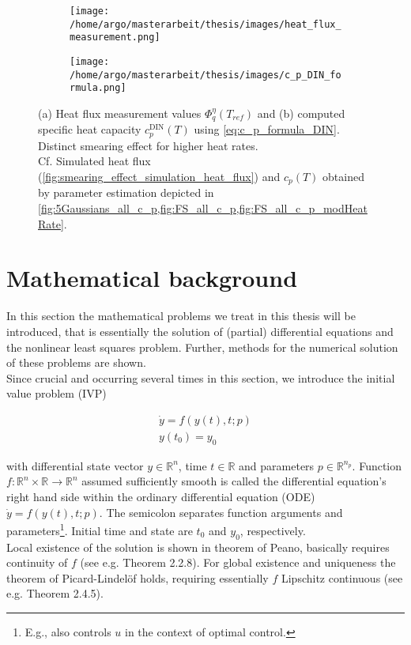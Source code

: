 \documentclass{scrartcl}[12pt, halfparskip]
\numberwithin{equation}{section}
\numberwithin{figure}{section}
\numberwithin{table}{section}
\begin{document}
\begin{figure}[H]
	\centering
	\begin{subfigure}{0.7\textwidth}
		\texttt{[image: /home/argo/masterarbeit/thesis/images/heat\_flux\_measurement.png]}
		\caption{}
		\label{fig:heat_flux_measurements}
	\end{subfigure}
	\begin{subfigure}{0.7\textwidth}
		\texttt{[image: /home/argo/masterarbeit/thesis/images/c\_p\_DIN\_formula.png]}
		\caption{}
		\label{fig:c_p_DIN_formula}
	\end{subfigure}
	\caption{(a) Heat flux measurement values $\varPhi_q^{\eta}(T_{ref})$ and (b) computed specific heat capacity $c_p^{\text{DIN}}(T)$ using \cref{eq:c_p_formula_DIN}. Distinct smearing effect for higher heat rates. \\
	Cf. Simulated heat flux (\cref{fig:smearing_effect_simulation_heat_flux}) and $c_p(T)$ obtained by parameter estimation depicted in \cref{fig:5Gaussians_all_c_p,fig:FS_all_c_p,fig:FS_all_c_p_modHeatRate}.}
\end{figure}


\newpage
\section{Mathematical background}
\label{sec:mathematical_background}

In this section the mathematical problems we treat in this thesis will be introduced, that is essentially the solution of (partial) differential equations and the nonlinear least squares problem. Further, methods for the numerical solution of these problems are shown. \\

Since crucial and occurring several times in this section, we introduce the initial value problem (IVP)

\begin{align}
	\dot{y} = f(y(t), t; p) \label{eq:initial_value_problem_definition} \\
	y(t_0) = y_0 \nonumber
\end{align}

with differential state vector $y \in \mathbb{R}^n$, time $t \in \mathbb{R}$ and parameters $p \in \mathbb{R}^{n_p}$. Function $f: \mathbb{R}^n \times \mathbb{R} \rightarrow \mathbb{R}^n$ assumed sufficiently smooth is called the differential equation's right hand side within the ordinary differential equation (ODE) $\dot{y} = f(y(t), t; p)$. The semicolon separates function arguments and  parameters\footnote{E.g., also controls $u$ in the context of optimal control.}. Initial time and state are $t_0$ and $y_0$, respectively. \\
Local existence of the solution is shown in theorem of Peano, basically requires continuity of $f$ (see e.g. \cite{ODE_analytic} Theorem 2.2.8).
For global existence and uniqueness the theorem of Picard-Lindelöf holds, requiring essentially $f$ Lipschitz continuous (see e.g. \cite{ODE_analytic} Theorem 2.4.5). \\
\end{document}
